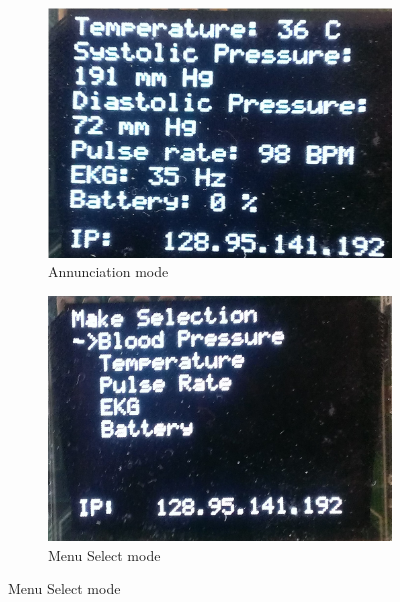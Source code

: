 \documentclass[12pt]{article} %
\begin{document}
\begin{itemize}
		\begin{figure}[p]
			\centering
			\begin{subfigure}{.48\textwidth}
				\includegraphics[width=\textwidth]{../design/oled_annunciation1.jpg}
				\caption{Annunciation mode}
				\label{fig:annun}
			\end{subfigure}
			\hfill
			\begin{subfigure}{0.48\textwidth}
				\includegraphics[width=\textwidth]{../design/oled_menu.jpg}
				\caption{Menu Select mode}
				\label{fig:menu}
			\end{subfigure}


\end{figure}
\end{itemize}
\end{document}
